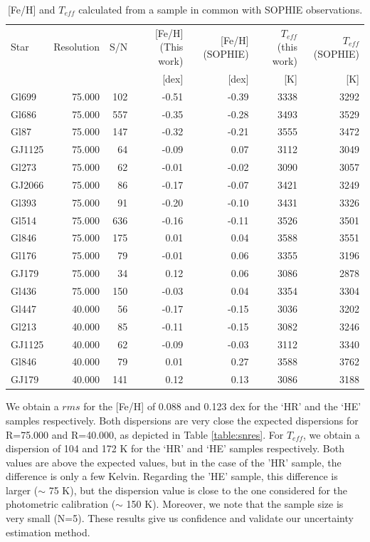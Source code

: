 \documentclass{aa}
\begin{document}
\begin{table}[]
\centering
\caption[]{[Fe/H] and $T_{eff}$ calculated from a sample in common with SOPHIE observations.}
\label{table:sophie}
\begin{center}
\begin{tabular}{l r r r r r r}
\hline
\hline
Star & Resolution & S/N & [Fe/H] (This work) & [Fe/H] (SOPHIE) & $T_{eff}$ (this work) & $T_{eff}$ (SOPHIE) \\
     &            &     &  [dex] & [dex]       &  [K] & [K]       \\
\hline
Gl699 & 75.000 & 102 & -0.51 & -0.39 & 3338 & 3292 \\
Gl686 & 75.000 & 557 & -0.35 & -0.28 & 3493 & 3529 \\
Gl87 & 75.000 & 147 & -0.32 & -0.21 & 3555 & 3472 \\
GJ1125 & 75.000 & 64 & -0.09 & 0.07 & 3112 & 3049 \\
Gl273 & 75.000 & 62 & -0.01 & -0.02 & 3090 & 3057 \\
GJ2066 & 75.000 & 86 & -0.17 & -0.07 & 3421 & 3249 \\
Gl393 & 75.000 & 91 & -0.20 & -0.10 & 3431 & 3326 \\
Gl514 & 75.000 & 636 & -0.16 & -0.11 & 3526 & 3501 \\
Gl846 & 75.000 & 175 & 0.01 & 0.04 & 3588 & 3551 \\
Gl176 & 75.000 & 79 & -0.01 & 0.06 & 3355 & 3196 \\
GJ179 & 75.000 & 34 & 0.12 & 0.06 & 3086 & 2878 \\
Gl436 & 75.000 & 150 & -0.03 & 0.04 & 3354 & 3304 \\
Gl447 & 40.000 & 56 & -0.17 & -0.15 & 3036 & 3202 \\
Gl213 & 40.000 & 85 & -0.11 & -0.15 & 3082 & 3246 \\
GJ1125 & 40.000 & 62 & -0.09 & -0.03 & 3112 & 3340 \\
Gl846 & 40.000 & 79 & 0.01 & 0.27 & 3588 & 3762 \\
GJ179 & 40.000 & 141 & 0.12 & 0.13 & 3086 & 3188 \\
\hline
\end{tabular}
\end{center}
\end{table}

We obtain a $rms$ for the [Fe/H] of 0.088 and 0.123 dex for the `HR' and the `HE' samples respectively. Both dispersions are very close the expected dispersions for R=75.000 and R=40.000, as depicted in Table \ref{table:snres}. For $T_{eff}$, we obtain a dispersion of 104 and 172 K for the `HR' and `HE' samples respectively. Both values are above the expected values, but in the case of the 'HR' sample, the difference is only a few Kelvin. Regarding the 'HE' sample, this difference is larger ($\sim$ 75 K), but the dispersion value is close to the one considered for the photometric calibration ($\sim$ 150 K). Moreover, we note that the sample size is very small (N=5). These results give us confidence and validate our uncertainty estimation method.
\end{document}

